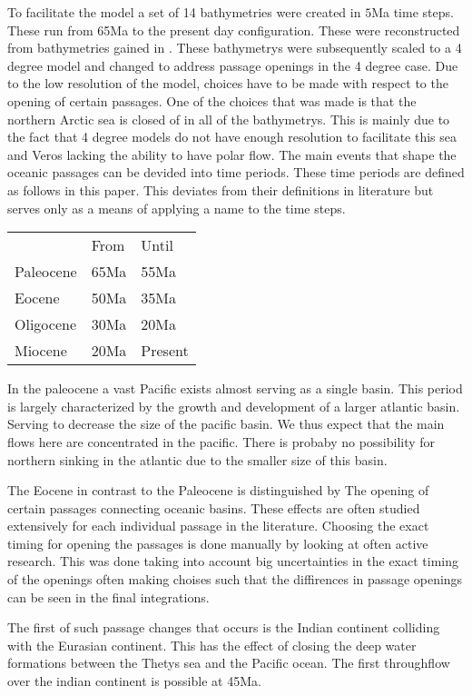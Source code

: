 To facilitate the model a set of 14 bathymetries were created in $5$Ma time steps. These run from 65Ma to the present day configuration. These were reconstructed from bathymetries gained in \cite{Baatsen2016Aug}.
These bathymetrys were subsequently scaled to a 4 degree model and changed to address passage openings in the 4 degree case. Due to the low resolution of the model, choices have to be made with respect to the opening of certain passages. One of the choices that was made is that the northern Arctic sea is closed of in all of the bathymetrys. This is mainly due to the fact that 4 degree models do not have enough resolution to facilitate this sea and Veros lacking the ability to have polar flow.
The main events that shape the oceanic passages can be devided into time periods. These time periods are defined as follows in this paper. This deviates from their definitions in literature but serves only as a means of applying a name to the time steps.
\begin{table}[H]
	\begin{tabular}{lll}
		&From &Until \\
		Paleocene & 65Ma&55Ma    \\
		Eocene    & 50Ma&35Ma     \\
		Oligocene & 30Ma&20Ma    \\
		Miocene   & 20Ma&Present 
	\end{tabular}
\end{table}
In the paleocene a vast Pacific exists almost serving as a single basin. This period is largely characterized by the growth and development of a larger atlantic basin. Serving to decrease the size of the pacific basin. We thus expect that the main flows here are concentrated in the pacific. There is probaby no possibility for northern sinking in the atlantic due to the smaller size of this basin.

The Eocene in contrast to the Paleocene is distinguished by The opening of certain passages connecting oceanic basins. These effects are often studied extensively for each individual passage in the literature. Choosing the exact timing for opening the passages is done manually by looking at often active research. This was done taking into account big uncertainties in the exact timing of the openings often making choises such that the diffirences in passage openings can be seen in the final integrations.
 
The first of such passage changes that occurs is the Indian continent colliding with the Eurasian continent. This has the effect of closing the deep water formations between the Thetys sea and the Pacific ocean. The first throughflow over the indian continent is possible at 45Ma.

